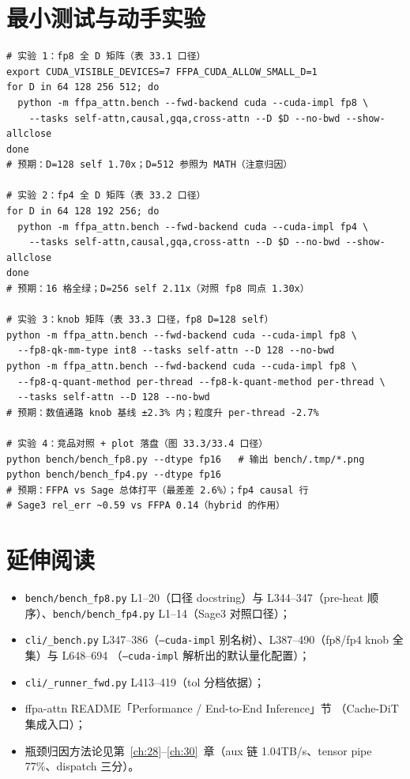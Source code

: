 \section{最小测试与动手实验}

\begin{lstlisting}[style=console]
# 实验 1：fp8 全 D 矩阵（表 33.1 口径）
export CUDA_VISIBLE_DEVICES=7 FFPA_CUDA_ALLOW_SMALL_D=1
for D in 64 128 256 512; do
  python -m ffpa_attn.bench --fwd-backend cuda --cuda-impl fp8 \
    --tasks self-attn,causal,gqa,cross-attn --D $D --no-bwd --show-allclose
done
# 预期：D=128 self 1.70x；D=512 参照为 MATH（注意归因）

# 实验 2：fp4 全 D 矩阵（表 33.2 口径）
for D in 64 128 192 256; do
  python -m ffpa_attn.bench --fwd-backend cuda --cuda-impl fp4 \
    --tasks self-attn,causal,gqa,cross-attn --D $D --no-bwd --show-allclose
done
# 预期：16 格全绿；D=256 self 2.11x（对照 fp8 同点 1.30x）

# 实验 3：knob 矩阵（表 33.3 口径，fp8 D=128 self）
python -m ffpa_attn.bench --fwd-backend cuda --cuda-impl fp8 \
  --fp8-qk-mm-type int8 --tasks self-attn --D 128 --no-bwd
python -m ffpa_attn.bench --fwd-backend cuda --cuda-impl fp8 \
  --fp8-q-quant-method per-thread --fp8-k-quant-method per-thread \
  --tasks self-attn --D 128 --no-bwd
# 预期：数值通路 knob 基线 ±2.3% 内；粒度升 per-thread -2.7%

# 实验 4：竞品对照 + plot 落盘（图 33.3/33.4 口径）
python bench/bench_fp8.py --dtype fp16   # 输出 bench/.tmp/*.png
python bench/bench_fp4.py --dtype fp16
# 预期：FFPA vs Sage 总体打平（最差差 2.6%）；fp4 causal 行
# Sage3 rel_err ~0.59 vs FFPA 0.14（hybrid 的作用）
\end{lstlisting}

\section*{延伸阅读}
\begin{itemize}[itemsep=0pt,topsep=2pt]
  \item \texttt{bench/bench\_fp8.py} L1--20（口径 docstring）与
        L344--347（pre-heat 顺序）、\texttt{bench/bench\_fp4.py}
        L1--14（Sage3 对照口径）；
  \item \texttt{cli/\_bench.py} L347--386（\texttt{--cuda-impl}
        别名树）、L387--490（fp8/fp4 knob 全集）与 L648--694
        （\texttt{--cuda-impl} 解析出的默认量化配置）；
  \item \texttt{cli/\_runner\_fwd.py} L413--419（tol 分档依据）；
  \item ffpa-attn README「Performance / End-to-End Inference」节
        （Cache-DiT 集成入口）；
  \item 瓶颈归因方法论见第~\ref{ch:28}--\ref{ch:30}~章（aux 链
        1.04TB/s、tensor pipe 77\%、dispatch 三分）。
\end{itemize}
